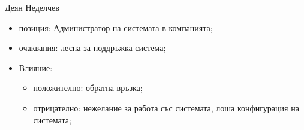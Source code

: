 \documentclass{beamer}
\begin{document}
\begin{frame}
    \begin{block}{Деян Неделчев}
        \begin{itemize}
            \item позиция: Администратор на системата в компанията;
            \item очаквания: лесна за поддръжка система;
            \item Влияние:
                \begin{itemize}
                    \item положително: обратна връзка;
                    \item отрицателно: нежелание за работа със системата,
                        лоша конфигурация на системата;
                \end{itemize}
        \end{itemize}

    \end{block}
\end{frame}
\end{document}
